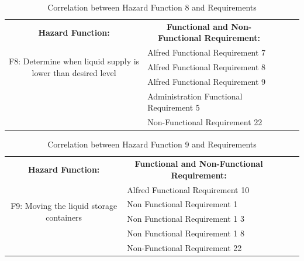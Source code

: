 \documentclass [10pt]{article}
\begin{document}
\begin{table}
\centering
\begin{tabular}{|c|l|lll}
\cline{1-2}
\textbf{Hazard Function:} & \multicolumn{1}{c|}{\textbf{Functional and Non-Functional Requirement:}} &  &  &  \\ \cline{1-2}
\multirow{3}{*}{F8: Determine when liquid supply is lower than desired level} 
				      & Alfred Functional Requirement 7	&  &  &  \\ \cline{2-2}
                                        & Alfred Functional Requirement 8	&  &  &  \\ \cline{2-2}
                                        & Alfred Functional Requirement 9	&  &  &  \\ \cline{2-2}
                                        & Administration Functional Requirement 5	&  &  &  \\ \cline{2-2}
                                        & Non-Functional Requirement 22	&  &  &  \\ \cline{1-2}
\end{tabular}
\caption{Correlation between Hazard Function 8 and Requirements}  
\end{table}




\begin{table}
\centering
\begin{tabular}{|c|l|lll}
\cline{1-2}
\textbf{Hazard Function:} & \multicolumn{1}{c|}{\textbf{Functional and Non-Functional Requirement:}} &  &  &  \\ \cline{1-2}
\multirow{4}{*}{F9: Moving the liquid storage containers} 
				      & Alfred Functional Requirement 10	&  &  &  \\ \cline{2-2}
                                        & Non Functional Requirement 1		&  &  &  \\ \cline{2-2}
                                        & Non Functional Requirement 1	3	&  &  &  \\ \cline{2-2}
                                        & Non Functional Requirement 1	8	&  &  &  \\ \cline{2-2}
                                        & Non-Functional Requirement 22	&  &  &  \\ \cline{1-2}
\end{tabular}
\caption{Correlation between Hazard Function 9 and Requirements}  
\end{table}
\end{document}
